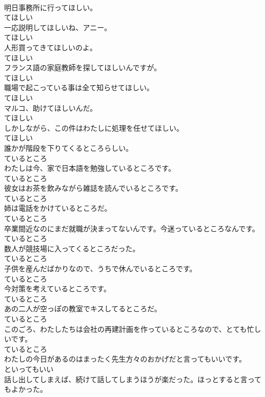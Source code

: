 \documentclass[8pt]{extreport}
\begin{document}
\begin{CJK}{UTF8}{min}
\\	明日事務所に行ってほしい。	
\\	てほしい
\\	一応説明してほしいね、アニー。	
\\	てほしい
\\	人形買ってきてほしいのよ。	
\\	てほしい
\\	フランス語の家庭教師を探してほしいんですが。	
\\	てほしい
\\	職場で起こっている事は全て知らせてほしい。	
\\	てほしい
\\	マルコ、助けてほしいんだ。	
\\	てほしい
\\	しかしながら、この件はわたしに処理を任せてほしい。	
\\	てほしい
\\	誰かが階段を下りてくるところらしい。	
\\	ているところ
\\	わたしは今、家で日本語を勉強しているところです。	
\\	ているところ
\\	彼女はお茶を飲みながら雑誌を読んでいるところです。	
\\	ているところ
\\	姉は電話をかけているところだ。	
\\	ているところ
\\	卒業間近なのにまだ就職が決まってないんです。今迷っているところなんです。	
\\	ているところ
\\	数人が競技場に入ってくるところだった。	
\\	ているところ
\\	子供を産んだばかりなので、うちで休んでいるところです。	
\\	ているところ
\\	今対策を考えているところです。	
\\	ているところ
\\	あの二人が空っぽの教室でキスしてるところだ。	
\\	ているところ
\\	このごろ、わたしたちは会社の再建計画を作っているところなので、とても忙しいです。	
\\	ているところ
\\	わたしの今日があるのはまったく先生方々のおかげだと言ってもいいです。	
\\	といってもいい
\\	話し出してしまえば、続けて話してしまうほうが楽だった。ほっとすると言ってもよかった。	

\end{CJK}
\end{document}
